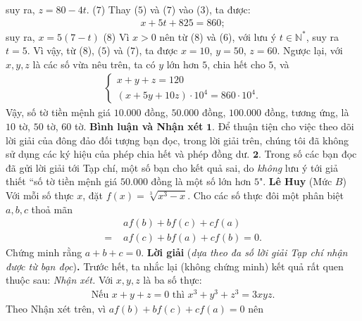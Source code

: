 \begin{multicols}{2}
	suy ra, $z = 80 - 4t$. \hfill ($7$)
	\vskip 0.05cm
	Thay ($5$) và ($7$) vào ($3$), ta được:
	\begin{align*}
		x + 5t + 825 = 860;
	\end{align*}
	suy ra,  $x = 5 (7-t)$ \hfill ($8$)
	\vskip 0.05cm
	Vì $x > 0$ nên từ ($8$) và ($6$), với lưu ý $t \in \mathbb{N^*}$,  suy ra $t = 5$. Vì vậy, từ ($8$), ($5$) và ($7$), ta được $x = 10$, $y = 50$, $z = 60$.
	\vskip 0.05cm
	Ngược lại, với $x, y, z$ là các số vừa nêu trên, ta có $y$ lớn hơn $5$, chia hết cho $5$, và
	\begin{align*}
		\begin{cases}
			x + y + z = 120\\[-0.5ex]
			(x + 5y + 10z) \cdot 10^4 = 860 \cdot 10^4.
		\end{cases}
	\end{align*}
	Vậy, số tờ tiền mệnh giá $10{.}000$ đồng, $50{.}000$ đồng, $100{.}000$ đồng, tương ứng, là $10$ tờ, $50$ tờ, $60$ tờ.
	\vskip 0.05cm
	\textbf{\color{thachthuctoanhoc}Bình luận và Nhận xét}
	\vskip 0.05cm	
	$\pmb{1.}$ Để thuận tiện cho việc theo dõi lời giải của đông đảo đối tượng bạn đọc, trong lời giải trên, chúng tôi đã không sử dụng các ký hiệu của phép chia hết và phép đồng dư.
	\vskip 0.05cm
	$\pmb{2.}$ Trong số các bạn đọc đã gửi lời giải tới Tạp chí, một số bạn cho kết quả sai, do \textit{không} lưu ý tới giả thiết ``số tờ tiền mệnh giá $50{.}000$ đồng là một số lớn hơn $5$".
	\vskip 0.05cm
	\hfill	\textbf{\color{thachthuctoanhoc}Lê Huy}
	\vskip 0.05cm
	{}
	(Mức $B$) Với mỗi số thực $x$, đặt $f(x)=\sqrt[3]{x^3-x}$. Cho các số thực đôi một phân biệt $a,b,c$ thoả mãn
	\begin{align*}
		&a f(b)+b f(c)+c f(a)\\[-0.5ex]
		=\,\,&a f(c)+b f(a)+c f(b)=0.
	\end{align*}
	Chứng minh rằng $a+b+c=0$. 
	\vskip 0.05cm
	\textbf{\color{thachthuctoanhoc}Lời giải} (\textit{dựa theo đa số lời giải Tạp chí nhận được từ bạn đọc})\textbf{\color{thachthuctoanhoc}.}
	\vskip 0.05cm
	Trước hết, ta nhắc lại (không chứng minh) kết quả rất quen thuộc sau:
	\vskip 0.05cm
	\textit{Nhận xét.} Với $x, y, z$ là ba số thực: 
	\begin{align*}
		\text{Nếu } x + y + z = 0 \text{ thì } {x^3} + {y^3} + {z^3} = 3xyz.   
	\end{align*}
	Theo Nhận xét trên, vì $af\left( b \right) + bf\left( c \right) + cf\left( a \right) = 0$  nên
	\begin{align*}

\end{align*}
\end{multicols}
